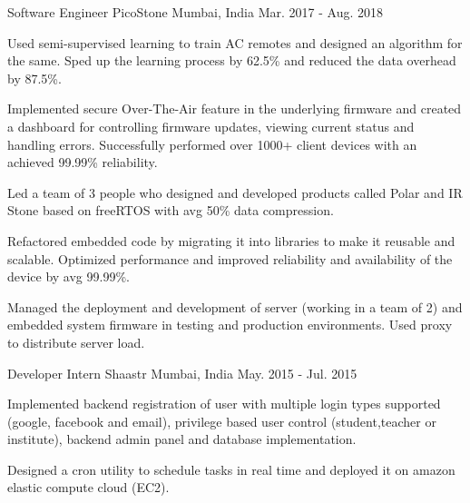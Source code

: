\begin{cventries}
	\cventry
	{Software Engineer} %
	{PicoStone} %
	{Mumbai, India} %
	{Mar. 2017 - Aug. 2018} %
	{ \begin{cvitems} %
	\item{Used semi-supervised learning to train AC remotes and designed an algorithm for the same. Sped up the learning process by 62.5\% and reduced the data overhead by 87.5\%.} %
      \item {Implemented secure Over-The-Air feature in the underlying firmware and created a dashboard for controlling firmware updates, viewing current status and handling errors. Successfully performed over 1000+ client devices with an achieved 99.99\% reliability.}
      \item {Led a team of 3 people who designed and developed products called Polar and IR Stone based on freeRTOS with avg 50\% data compression.}  %
      \item {Refactored embedded code by migrating it into libraries to make it reusable and scalable. Optimized performance and improved reliability and availability of the device by avg 99.99\%.}  %
      \item {Managed the deployment and development of server (working in a team of 2) and embedded system firmware in testing and production environments. Used proxy to distribute server load.}
     \end{cvitems}
  }


	\cventry
	{Developer Intern} %
	{Shaastr } %
	{Mumbai, India} %
	{May. 2015 - Jul. 2015} %
	{
		\begin{cvitems} %
			\item {Implemented backend registration of user with multiple login types supported (google, facebook and email), privilege based user control (student,teacher or institute), backend admin panel and database implementation.}
			\item {Designed a cron utility to schedule tasks in real time and deployed it on amazon elastic compute cloud (EC2).}
		\end{cvitems}
	}

\end{cventries}
